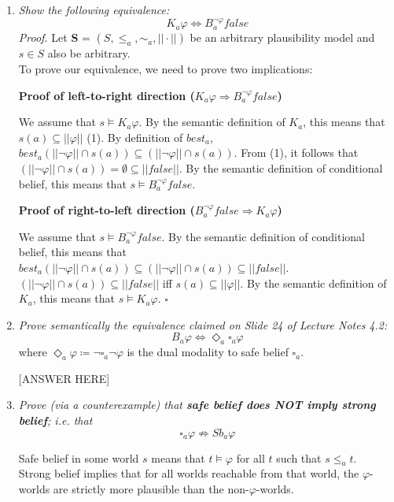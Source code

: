 \documentclass[leqno]{article}
\begin{document}
\begin{enumerate}[label=(\alph*)]
	\item \textit{Show the following equivalence:}
		$$K_a \varphi \Leftrightarrow B_a^{\neg \varphi} false$$
		\textit{Proof.} Let \textbf{S} = $(S, \le_a, \sim_a, ||\cdot||)$ be an 
		arbitrary plausibility model and $s \in S$ also be arbitrary.\\
		To prove our equivalence, we need to prove two implications:
		
		\textbf{Proof of left-to-right direction 
		($K_a \varphi \Rightarrow B_a^{\neg \varphi} false$)}
		
		We assume that $s \models K_a \varphi$. By the semantic definition of $K_a$,
		this means that $s(a) \subseteq ||\varphi||$ (1). By definition of $best_a$, 
		$best_a(||\neg \varphi|| \cap s(a)) \subseteq 
		(||\neg \varphi|| \cap s(a))$. From (1), it follows that 
		$(||\neg \varphi|| \cap s(a)) = \emptyset \subseteq ||false||$. By the 
		semantic definition of conditional belief, this means that 
		$s \models B_a^{\neg \varphi} false$.
		
		\textbf{Proof of right-to-left direction 
		($B_a^{\neg \varphi} false \Rightarrow K_a \varphi$)}
		
		We assume that $s \models B_a^{\neg \varphi} false$. By the semantic 
		definition of conditional belief, this means that 
		$best_a(||\neg \varphi|| \cap s(a)) \subseteq (||\neg \varphi|| \cap s(a)) 
		\subseteq ||false||$. $(||\neg \varphi|| \cap s(a)) \subseteq ||false||$ iff 
		$s(a) \subseteq ||\varphi||$. By the semantic definition of $K_a$, this means
		 that $s \models K_a \varphi$. 
		\hfill $\square$

	\item \textit{Prove semantically the equivalence claimed on Slide 24 of
		Lecture Notes 4.2:}
		$$B_a \varphi \Leftrightarrow \Diamond_a \square_a \varphi$$
		where $\Diamond_a \varphi \coloneqq \neg \square_a \neg \varphi$ is the dual
		modality to safe belief $\square_a$.

		[ANSWER HERE]

	\item \textit{Prove (via a counterexample) that \textbf{safe belief does NOT
		imply strong belief}; i.e. that}
		$$\square_a \varphi \not\Rightarrow Sb_a \varphi$$

        Safe belief in some world $s$ means that $t \models \varphi$ for all $t$ such that 
        $s \leq_a t$.\\
        Strong belief implies that for all worlds reachable from that world, 
        the $\varphi$-worlds are strictly more plausible than the 
        non-$\varphi$-worlds.
        

\end{enumerate}
\end{document}
